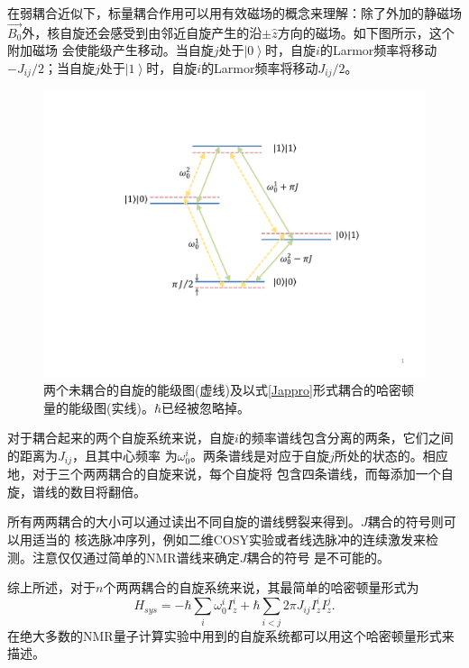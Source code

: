 在弱耦合近似下，标量耦合作用可以用有效磁场的概念来理解：除了外加的静磁场$\overrightarrow{B_0}$外，核自旋还会感受到由邻近自旋产生的沿$\pm\hat{z}$方向的磁场。如下图所示，这个附加磁场
会使能级产生移动。当自旋$j$处于$\left\vert  0 \right\rangle$时，自旋$i$的Larmor频率将移动$-J_{ij}/2$；当自旋$j$处于$\left\vert  1\right\rangle$时，自旋$i$的Larmor频率将移动$J_{ij}/2$。

\begin{figure}[htbp]
            \begin{center}
              \includegraphics[width= 0.8\columnwidth]{figures/energy.pdf}
              \caption{两个未耦合的自旋的能级图(虚线)及以式\ref{Jappro}形式耦合的哈密顿量的能级图(实线)。$\hbar$已经被忽略掉。
              }
              \label{energy}
            \end{center}
\end{figure}

对于耦合起来的两个自旋系统来说，自旋$i$的频率谱线包含分离的两条，它们之间的距离为$J_{ij}$，且其中心频率
为$\omega_0^i$。两条谱线是对应于自旋$j$所处的状态的。相应地，对于三个两两耦合的自旋来说，每个自旋将
包含四条谱线，而每添加一个自旋，谱线的数目将翻倍。

所有两两耦合的大小可以通过读出不同自旋的谱线劈裂来得到。$J$耦合的符号则可以用适当的
核选脉冲序列，例如二维COSY实验\cite{sign1}或者线选脉冲的连续激发来检测。注意仅仅通过简单的NMR谱线来确定$J$耦合的符号
是不可能的。

综上所述，对于$n$个两两耦合的自旋系统来说，其最简单的哈密顿量形式为
\begin{equation}\label{aaa}
H_{sys} =-\hbar\sum_{i}\omega_0^i I_z^i+ \hbar\sum_{i<j} 2\pi J_{ij}I_z^iI_z^j.
\end{equation}
在绝大多数的NMR量子计算实验中用到的自旋系统都可以用这个哈密顿量形式来描述。

